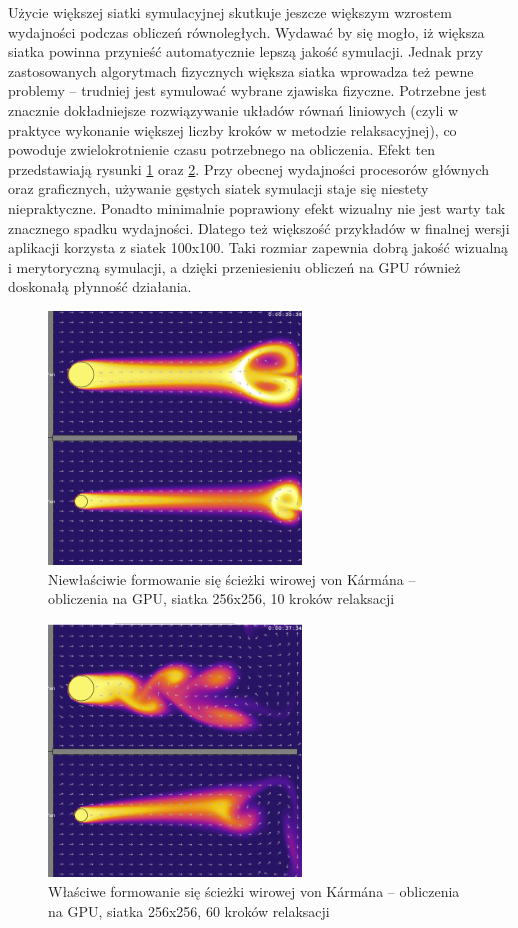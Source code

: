 Użycie większej siatki symulacyjnej skutkuje jeszcze większym wzrostem
wydajności podczas obliczeń równoległych. Wydawać by się mogło, iż większa
siatka powinna przynieść automatycznie lepszą jakość symulacji. Jednak przy
zastosowanych algorytmach fizycznych większa siatka wprowadza też pewne problemy
-- trudniej jest symulować wybrane zjawiska fizyczne. Potrzebne jest znacznie
dokładniejsze rozwiązywanie układów równań liniowych (czyli w praktyce wykonanie
większej liczby kroków w metodzie relaksacyjnej), co powoduje zwielokrotnienie
czasu potrzebnego na obliczenia. Efekt ten przedstawiają rysunki
\ref{fig:relaxGPU1} oraz \ref{fig:relaxGPU2}. Przy obecnej wydajności procesorów
głównych oraz graficznych, używanie gęstych siatek symulacji staje się niestety
niepraktyczne. Ponadto minimalnie poprawiony efekt wizualny nie jest warty tak
znacznego spadku wydajności. Dlatego też większość przykładów w finalnej wersji
aplikacji korzysta z siatek 100x100. Taki rozmiar zapewnia dobrą jakość wizualną
i merytoryczną symulacji, a dzięki przeniesieniu obliczeń na GPU również
doskonałą płynność działania.

\begin{figure}[!h]
\centering
\includegraphics[width=0.6\textwidth]{img/relaxGPU1}
\caption{Niewłaściwie formowanie się ścieżki wirowej von Kármána -- obliczenia na
GPU, siatka 256x256, 10 kroków relaksacji}
\label{fig:relaxGPU1}
\end{figure}

\begin{figure}[!h]
\centering
\includegraphics[width=0.6\textwidth]{img/relaxGPU2}
\caption{Właściwe formowanie się ścieżki wirowej von Kármána -- obliczenia na GPU,
siatka 256x256, 60 kroków relaksacji}
\label{fig:relaxGPU2}
\end{figure}

